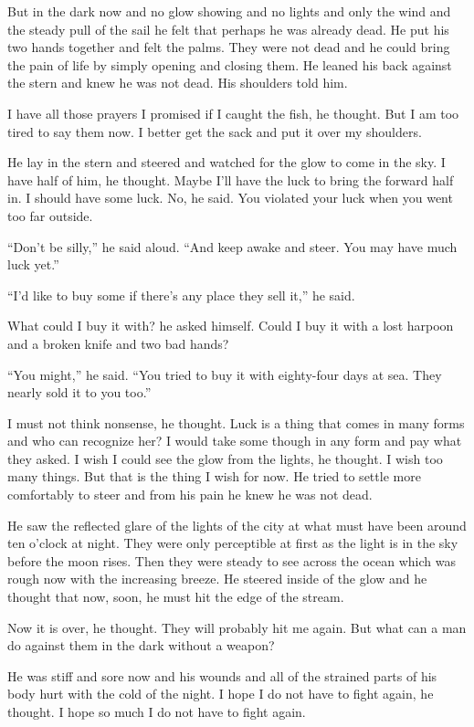 \documentclass[fontset=ubuntu,zihao=-4]{ctexrep}
\begin{document}
But in the dark now and no glow showing and no lights and only the wind and
the steady pull of the sail he felt that perhaps he was already dead. He put
his two hands together and felt the palms. They were not dead and he could
bring the pain of life by simply opening and closing them. He leaned his
back against the stern and knew he was not dead. His shoulders told him.

I have all those prayers I promised if I caught the fish, he thought. But I
am too tired to say them now. I better get the sack and put it over my
shoulders.

He lay in the stern and steered and watched for the glow to come in the
sky. I have half of him, he thought. Maybe I'll have the luck to bring the
forward half in. I should have some luck. No, he said. You \gls{violated} your
luck when you went too far outside.

``Don't be silly,'' he said aloud. ``And keep awake and steer. You may have
much luck yet.''

``I'd like to buy some if there's any place they sell it,'' he said.

What could I buy it with? he asked himself. Could I buy it with a lost
harpoon and a broken knife and two bad hands?

``You might,'' he said. ``You tried to buy it with eighty-four days at sea.
They nearly sold it to you too.''

I must not think nonsense, he thought. Luck is a thing that comes in many
forms and who can \gls{recognize} her? I would take some though in any form
and pay what they asked. I wish I could see the glow from the lights, he
thought. I wish too many things. But that is the thing I wish for now. He
tried to settle more comfortably to steer and from his pain he knew he was
not dead.

He saw the \gls{reflected} glare of the lights of the city at what must have
been around ten o'clock at night. They were only \gls{perceptible} at first
as the light is in the sky before the moon rises. Then they were steady to
see across the ocean which was rough now with the increasing breeze. He
steered inside of the glow and he thought that now, soon, he must hit the
edge of the stream.

Now it is over, he thought. They will probably hit me again. But what can a
man do against them in the dark without a weapon?

He was stiff and sore now and his wounds and all of the \gls{strained}
parts of his body hurt with the cold of the night. I hope I do not have to
fight again, he thought. I hope so much I do not have to fight again.
\end{document}
